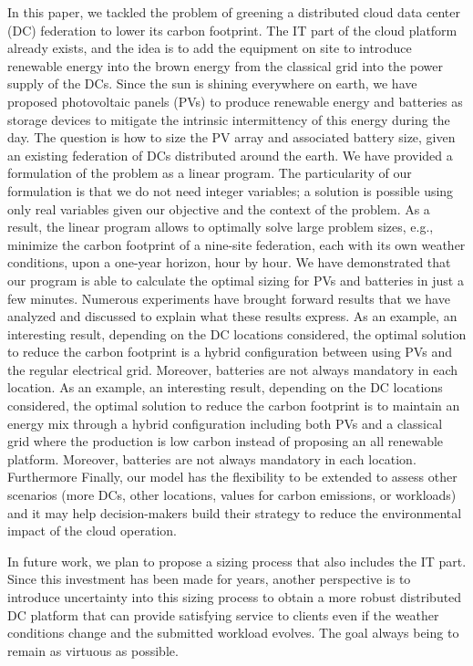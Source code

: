 In this paper, we tackled the problem of greening a distributed cloud data center (DC) federation to lower its carbon footprint. The IT part of the cloud platform already exists, and the idea is to add the equipment on site to introduce renewable energy into the brown energy from the classical grid into the power supply of the DCs. Since the sun is shining everywhere on earth, we have proposed photovoltaic panels (PVs) to produce renewable energy and batteries as storage devices to mitigate the intrinsic intermittency of this energy during the day. The question is how to size the PV array and associated battery size, given an existing federation of DCs distributed around the earth.
We have provided a formulation of the problem as a linear program. The particularity of our formulation is that we do not need integer variables; a solution is possible using only real variables given our objective and the context of the problem. As a result, the linear program allows to optimally solve large problem sizes, e.g., minimize the carbon footprint of a nine-site federation, each with its own weather conditions, upon a one-year horizon, hour by hour. We have demonstrated that our program is able to calculate the optimal sizing for PVs and batteries in just a few minutes. Numerous experiments have brought forward results that we have analyzed and discussed to explain what these results express. As an example, an interesting result, depending on the DC locations considered, the optimal solution to reduce the carbon footprint is a hybrid configuration between using PVs and the regular electrical grid. Moreover, batteries are not always mandatory in each location. As an example, an interesting result, depending on the DC locations considered, the optimal solution to reduce the carbon footprint is to maintain an energy mix through a hybrid configuration including both PVs and a classical grid where the production is low carbon instead of proposing an all renewable platform. Moreover, batteries are not always mandatory in each location. Furthermore
Finally, our model has the flexibility to be extended to assess other scenarios (more DCs, other locations, values for  carbon emissions, or workloads) and it may help decision-makers build their strategy to reduce the environmental impact of the cloud operation. 

In future work, we plan to propose a sizing process that also includes the IT part. Since this investment has been made for years, another perspective is to introduce uncertainty into this sizing process to obtain a more robust distributed DC platform that can provide satisfying service to clients even if the weather conditions change and the submitted workload evolves. The goal always being to remain as virtuous as possible.
